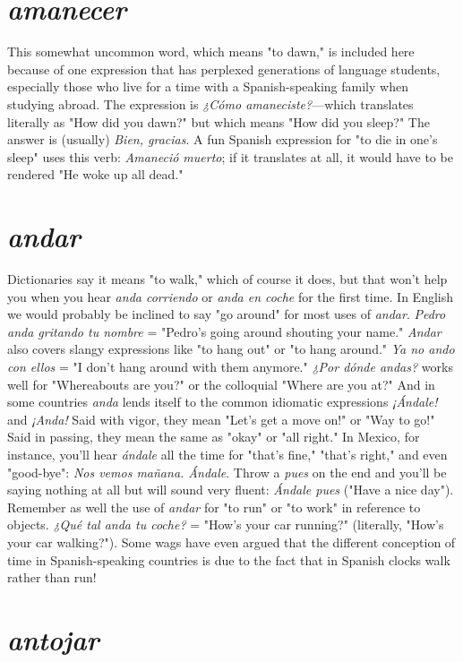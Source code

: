 \documentclass[14pt,a4paper,oneside]{memoir}
\begin{document}
\section{\emph{amanecer}}

This somewhat uncommon word, which means "to dawn," is
included here because of one expression that has perplexed generations
of language students, especially those who live for a time with a
Spanish-speaking family when studying abroad. The expression is
\emph{¿Cómo amaneciste?}---which translates literally as "How did you
dawn?" but which means "How did you sleep?" The answer is (usually) \emph{Bien, gracias}. A fun Spanish expression for "to die in one's sleep"
uses this verb: \emph{Amaneció muerto}; if it translates at all, it would have
to be rendered "He woke up all dead."

\section{\emph{andar}}

Dictionaries say it means "to walk," which of course it does,
but that won't help you when you hear \emph{anda corriendo} or \emph{anda en
coche} for the first time. In English we would probably be inclined
to say "go around" for most uses of \emph{andar}. \emph{Pedro anda gritando tu
nombre} = "Pedro's going around shouting your name." \emph{Andar} also
covers slangy expressions like "to hang out" or "to hang around." \emph{Ya
no ando con ellos} = "I don't hang around with them anymore." \emph{¿Por
dónde andas?} works well for "Whereabouts are you?" or the colloquial
"Where are you at?" And in some countries \emph{anda} lends itself to the
common idiomatic expressions \emph{¡Ándale!} and \emph{¡Anda!} Said with vigor,
they mean "Let's get a move on!" or "Way to go!" Said in passing, they
mean the same as "okay" or "all right." In Mexico, for instance, you'll
hear \emph{ándale} all the time for "that's fine," "that's right," and even
"good-bye": \emph{Nos vemos mañana. Ándale}. Throw a \emph{pues} on the end
and you'll be saying nothing at all but will sound very fluent: \emph{Ándale
pues} ("Have a nice day"). Remember as well the use of \emph{andar} for "to
run" or "to work" in reference to objects. \emph{¿Qué tal anda tu coche?} =
"How's your car running?" (literally, "How's your car walking?").
Some wags have even argued that the different conception of time in
Spanish-speaking countries is due to the fact that in Spanish clocks
walk rather than run!

\section{\emph{antojar}}
\end{document}
